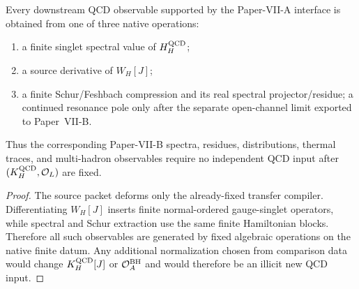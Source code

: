 \documentclass[12pt,a4paper]{article}
\begin{document}
\begin{theorem}
\label{p10:thm:source-interface-universality}
Every downstream QCD observable supported by the Paper-VII-A interface is obtained from one of three native
operations:
\begin{enumerate}[label=\textnormal{(\roman*)},leftmargin=2.1em]
\item a finite singlet spectral value of \(H_H^{\rm QCD}\);
\item a source derivative of \(W_H[J]\);
\item a finite Schur/Feshbach compression and its real spectral
      projector/residue; a continued resonance pole only after the separate
      open-channel limit exported to Paper~VII-B.
\end{enumerate}
Thus the corresponding Paper-VII-B spectra, residues, distributions, thermal traces, and multi-hadron observables require no independent QCD input after
\((K_H^{\rm QCD},\mathcal O_L)\) are fixed.
\end{theorem}
\begin{proof}
The source packet deforms only the already-fixed transfer compiler.  Differentiating
\(W_H[J]\) inserts finite normal-ordered gauge-singlet operators, while spectral and
Schur extraction use the same finite Hamiltonian blocks.  Therefore all such observables
are generated by fixed algebraic operations on the native finite datum.  Any additional
normalization chosen from comparison data would change \(K_H^{\rm QCD}[J]\) or
\(\mathcal O_A^{\rm BH}\) and would therefore be an illicit new QCD input.
\end{proof}
\end{document}

